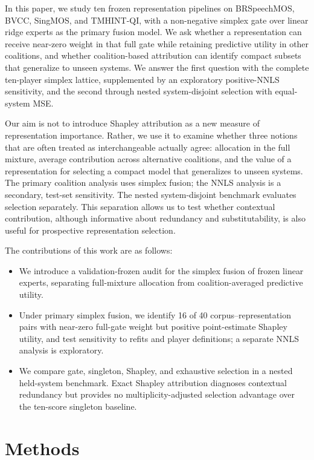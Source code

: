 \documentclass{article}
\begin{document}
In this paper, we study ten frozen representation pipelines on BRSpeechMOS,
BVCC, SingMOS, and TMHINT-QI, with a non-negative simplex gate over linear
ridge experts as the primary fusion model. We ask whether a representation can
receive near-zero weight in that full gate while retaining predictive utility
in other coalitions, and whether coalition-based attribution can identify
compact subsets that generalize to unseen systems. We answer the first question
with the complete ten-player simplex lattice, supplemented by an exploratory
positive-NNLS sensitivity, and the second through nested system-disjoint
selection with equal-system MSE.


Our aim is not to introduce Shapley attribution as a new measure of representation importance. Rather, we use it to examine whether three notions that are often treated as interchangeable actually agree: allocation in the full mixture, average contribution across alternative coalitions, and the value of a representation for selecting a compact model that generalizes to unseen systems. The primary coalition analysis uses simplex fusion; the NNLS analysis is a secondary, test-set sensitivity. The nested system-disjoint benchmark evaluates selection separately. This separation allows us to test whether contextual contribution, although informative about redundancy and substitutability, is also useful for prospective representation selection.

The contributions of this work are as follows:
\begin{itemize}
  \setlength{\itemsep}{0pt}
  \setlength{\parsep}{0pt}
  \setlength{\topsep}{2pt}
  \item We introduce a validation-frozen audit for the simplex fusion of
  frozen linear experts, separating full-mixture allocation from
  coalition-averaged predictive utility.
  \item Under primary simplex fusion, we identify 16 of 40
  corpus--representation pairs with near-zero full-gate weight but positive
  point-estimate Shapley utility, and test sensitivity to refits and player
  definitions; a separate NNLS analysis is exploratory.
  \item We compare gate, singleton, Shapley, and exhaustive selection in a
  nested held-system benchmark. Exact Shapley attribution diagnoses contextual
  redundancy but provides no multiplicity-adjusted selection advantage over the
  ten-score singleton baseline.
\end{itemize}

\section{Methods}
\label{sec:methods}
\end{document}
